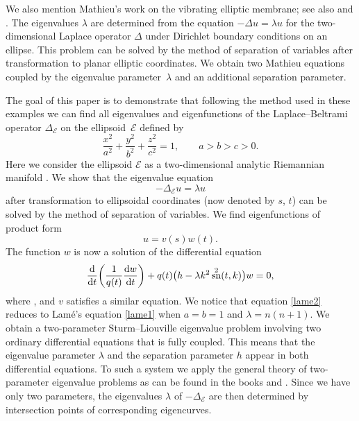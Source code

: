 \documentclass[10pt,a4paper]{amsart}
\newcommand{\E}{\mathcal{E}}
\newcommand{\D}{\Delta_\E}
\DeclareMathOperator{\sn}{sn}
\DeclareMathOperator{\cn}{cn}
\numberwithin{equation}{section}
\begin{document}
We also mention Mathieu's work \cite{M} on the vibrating elliptic membrane; see also \cite[Section~4.31]{MS} and \cite[p.~4]{Vbook}.
The eigenvalues $\lambda$ are determined from the equation $-\Delta u=\lambda u$ for the two-dimensional Laplace operator $\Delta$ under Dirichlet boundary conditions on an ellipse.
This problem can be solved by the method of separation of variables after transformation to planar elliptic coordinates.
We obtain two Mathieu equations coupled by the eigenvalue parameter~$\lambda$ and an additional separation parameter.

The goal of this paper is to demonstrate that following the method used in these examples we can find all eigenvalues and eigenfunctions of
the Laplace--Beltrami operator $\D$ on the ellipsoid~$\E$ defined by
\begin{equation}\label{ellipsoid}
 \frac{x^2}{a^2}+\frac{y^2}{b^2}+\frac{z^2}{c^2}=1,\qquad a>b>c>0.
 \end{equation}
Here we consider the ellipsoid $\E$ as a two-dimensional analytic Riemannian manifold \cite{J}.
We show that the eigenvalue equation
\begin{equation}\label{problem}
 -\D u=\lambda u
 \end{equation}
after transformation to ellipsoidal coordinates (now denoted by $s$, $t$) can be solved by the method of separation of variables.
We find eigenfunctions of product form
\begin{equation}\label{product2}
 u= v(s) w(t).
\end{equation}
The function $w$ is now a solution of the differential equation
\begin{equation}\label{lame2}
\frac{{\rm d}}{{\rm d}t}\biggl(\frac{1}{q(t)}\frac{{\rm d}w}{{\rm d}t}\biggr)+q(t)\bigl(h-\lambda k^2\sn^2(t,k)\bigr)w=0,
\end{equation}
where \smash{$q(t):=\bigl(a^2\cn^2(t,k)+b^2\sn^2(t,k)\bigr)^{1/2}$},
and $v$ satisfies a similar equation.
We notice that equation \eqref{lame2} reduces to Lam\'e's equation \eqref{lame1}
when $a=b=1$ and $\lambda=n(n+1)$.
We obtain a two-parameter Sturm--Liouville eigenvalue problem
involving two ordinary differential equations
that is fully coupled. This means that the eigenvalue parameter $\lambda$ and the separation parameter $h$
appear in both differential equations. To such a system we
apply the general theory of two-parameter eigenvalue problems as can be found in the books
\cite{AM} and \cite{Vbook}. Since we have only two parameters, the eigenvalues $\lambda$ of $-\D$ are then determined by intersection points of corresponding eigencurves.
\end{document}
